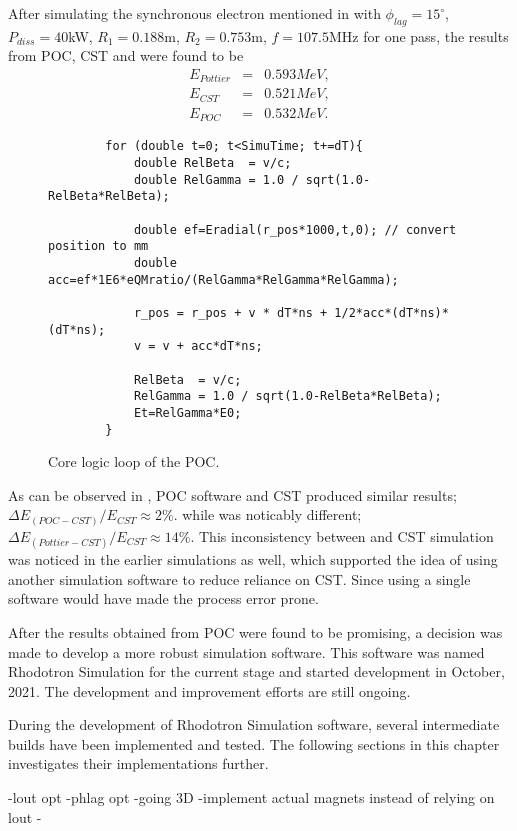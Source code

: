 \documentclass{article}
\begin{document}
After simulating the synchronous electron mentioned in  
with $\phi_{lag}=15^\circ$, $P_{diss}=40$kW, $R_1=0.188$m, $R_2=0.753$m, $f=107.5$MHz for one pass, 
the results from POC, CST and  were found to be
\vspace{-20pt}\begin{eqnarray}
    E_{Pottier} &=& 0.593 MeV  , \\
    E_{CST} &=& 0.521 MeV  ,  \label{eq:poc_E_results}\\
    E_{POC} &=& 0.532 MeV . 
\end{eqnarray}

\begin{figure}[H]
    \begin{verbatim}
        for (double t=0; t<SimuTime; t+=dT){
            double RelBeta  = v/c;
            double RelGamma = 1.0 / sqrt(1.0-RelBeta*RelBeta);
        
            double ef=Eradial(r_pos*1000,t,0); // convert position to mm
            double acc=ef*1E6*eQMratio/(RelGamma*RelGamma*RelGamma); 
        
            r_pos = r_pos + v * dT*ns + 1/2*acc*(dT*ns)*(dT*ns);
            v = v + acc*dT*ns;

            RelBeta  = v/c;
            RelGamma = 1.0 / sqrt(1.0-RelBeta*RelBeta);
            Et=RelGamma*E0; 
        }
    \end{verbatim}
    \vspace{-3pt}
    \caption{Core logic loop of the POC.}
    \label{fig:POC_core_logic}
\end{figure}


\vspace{-15pt}
As can be observed in , POC software and CST produced similar results; $\Delta E_{(POC-CST)}/E_{CST} \approx 2\%$.
while  was noticably different; $\Delta E_{(Pottier-CST)}/E_{CST} \approx 14\%$.
This inconsistency between  and  CST simulation was noticed in the earlier simulations as well, which supported the idea of using another simulation software to reduce reliance on CST.
Since using a single software would have made the process error prone.

After the results obtained from POC were found to be promising, a decision was made to develop a more robust simulation software. This software was named Rhodotron Simulation for the current stage and started development in October, 2021.
The development and improvement efforts are still ongoing. 

During the development of Rhodotron Simulation software, several intermediate builds have been implemented and tested. The following sections in this chapter investigates their implementations further.



-lout opt
-phlag opt
-going 3D
-implement actual magnets instead of relying on lout
-
\end{document}
